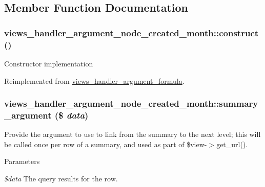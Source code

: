 \subsection{Member Function Documentation}
\hypertarget{classviews__handler__argument__node__created__month_a0f9b4da1f37a58ca3e416667dc8d9bbb}{
\subsubsection[{construct}]{\setlength{\rightskip}{0pt plus 5cm}views\_\-handler\_\-argument\_\-node\_\-created\_\-month::construct ()}}
\label{classviews__handler__argument__node__created__month_a0f9b4da1f37a58ca3e416667dc8d9bbb}
Constructor implementation 

Reimplemented from \hyperlink{classviews__handler__argument__formula_a01284402427de2bcfa1b1da5792a2332}{views\_\-handler\_\-argument\_\-formula}.\hypertarget{classviews__handler__argument__node__created__month_a4ecc9b35ee8ae4e8d61d18e83f1dfe82}{
\subsubsection[{summary\_\-argument}]{\setlength{\rightskip}{0pt plus 5cm}views\_\-handler\_\-argument\_\-node\_\-created\_\-month::summary\_\-argument (\$ {\em data})}}
\label{classviews__handler__argument__node__created__month_a4ecc9b35ee8ae4e8d61d18e83f1dfe82}
Provide the argument to use to link from the summary to the next level; this will be called once per row of a summary, and used as part of \$view-\/$>$get\_\-url().


\begin{DoxyParams}{Parameters}
\item[{\em \$data}]The query results for the row. \end{DoxyParams}


